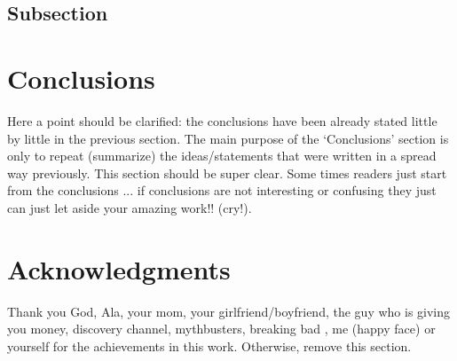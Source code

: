 \documentclass[fleqn,12pt]{NTFD} %
\newlength{\tocsep}
\begin{document}
\lipsum[14] %

\subsection{Subsection}

\lipsum[15-23] %


\section{Conclusions} %

Here a point should be clarified: the conclusions have been already stated little by little in the previous section. The main purpose of the `Conclusions' section is only to repeat (summarize) the ideas/statements that were written in a spread way previously. This section should be super clear. Some times readers just start from the conclusions ... if conclusions are not interesting or confusing they just can just let aside your amazing work!! (cry!).


\section*{Acknowledgments} %


Thank you God, Ala, your mom, your girlfriend/boyfriend, the guy who is giving you money, discovery channel, mythbusters, breaking bad , me (happy face) or yourself for the achievements in this work. Otherwise, remove this section.





\end{document}
